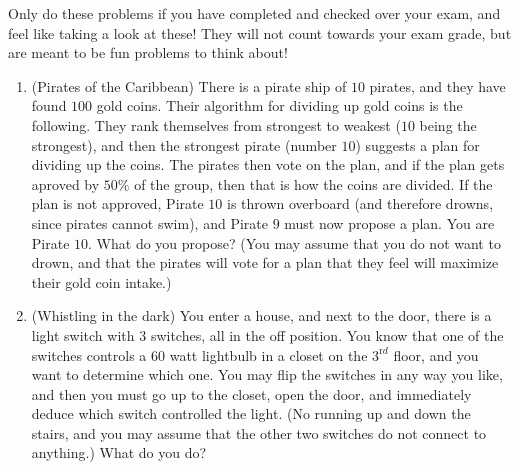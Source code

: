 \documentclass[10pt]{amsart}
\begin{document}
\begin{enumerate}
\vfill\pagebreak

 Only do these
problems if you have completed and checked over your exam, and feel like
taking a look at these!  They will not count
towards your exam grade, but are meant to be fun problems to think
about!

\begin{enumerate}
\item ({\sc Pirates of the Caribbean}) There is a pirate ship of $10$
pirates, and they have found $100$ gold coins.  Their algorithm for
dividing up gold coins is the following.  They rank themselves from
strongest to weakest ($10$ being the strongest), and then the
strongest pirate (number $10$) suggests a plan for dividing up the
coins.  The pirates then vote on the plan, and if the plan gets aproved
by $50\%$ of the group, then that is how the coins are divided.  If
the plan is not approved, Pirate $10$ is thrown overboard (and
therefore drowns, since pirates cannot swim), and Pirate $9$ must now
propose a plan.  You are Pirate $10$.  What do you propose?  (You may
assume that you do not want to drown, and that the pirates will vote
for a plan that they feel will maximize their gold coin intake.)
\vfill\pagebreak
\item ({\sc Whistling in the dark}) You enter a house, and next to the 
door, there is a light switch with $3$ switches, all in the off
position.  You know that one of the switches controls a $60$ watt 
lightbulb in a closet on the $3^{\mathrm rd}$ floor, and you want to
determine which one.  You may flip the switches in any way you like,
and then you must go up to the closet, open the door, and immediately
deduce which switch controlled the light.  (No running up and down the 
stairs, and you may assume that the other two switches do not connect
to anything.)  What do you do?
\end{enumerate}


\end{enumerate}
\end{document}
